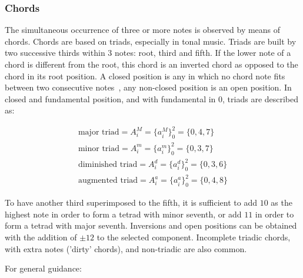 \subsubsection{Chords}\label{subsec:acordes}

The simultaneous occurrence of three or more notes is observed by means of chords. Chords are based on triads, especially in tonal music. Triads are built by two successive thirds
within 3 notes: root, third and fifth. If the lower note of a chord is different from the root, this chord is an inverted chord as opposed to the chord in its root position. A closed position is any in which no chord note fits between two consecutive
notes~\cite{Lacerda}, any non-closed position is an open position. In closed and fundamental position,
and with fundamental in $0$, triads are described as:

\begin{equation}\label{triades}
\begin{split}
\text{major triad} = A_i^M= \{a_i^M\}_0^2=\{0,4,7\} \\ 
\text{minor triad} = A_i^m = \{a_i^m\}_0^2=\{0,3,7\} \\
\text{diminished triad} = A_i^d = \{a_i^d\}_0^2=\{0,3,6\} \\
\text{augmented triad} = A_i^a = \{a_i^a\}_0^2=\{0,4,8\}
\end{split}
\end{equation}

To have another third superimposed to the fifth, it is sufficient to add $10$ as the highest note in order to form a tetrad with minor seventh, or add $11$ in order to form a tetrad with major
seventh. Inversions and open positions can be obtained with the 
addition of $\pm 12$ to the selected component. Incomplete triadic chords, with extra notes ('dirty' chords), and non-triadic
are also common.

For general guidance:

